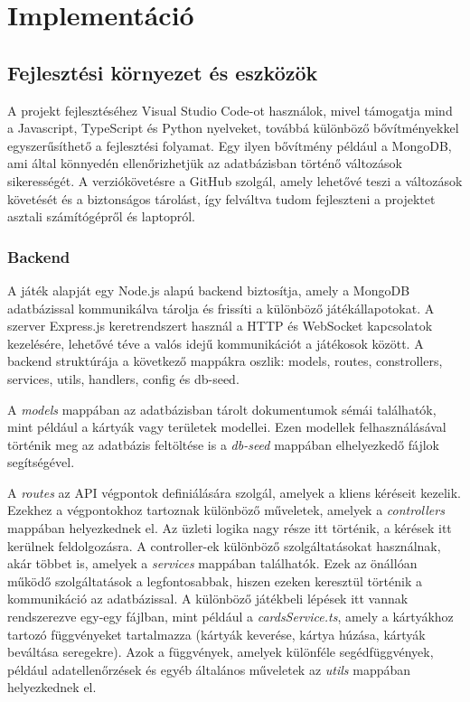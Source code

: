 \documentclass[
]{thesis-ekf}
\theoremstyle{definition}
\theoremstyle{remark}
\begin{document}
\chapter{Implementáció}

\section{Fejlesztési környezet és eszközök}

A projekt fejlesztéséhez Visual Studio Code-ot használok, mivel támogatja mind a Javascript, TypeScript és Python nyelveket, továbbá különböző bővítményekkel egyszerűsíthető a fejlesztési folyamat. Egy ilyen bővítmény például a MongoDB, ami által könnyedén ellenőrizhetjük az adatbázisban történő változások sikerességét. A verziókövetésre a GitHub szolgál, amely lehetővé teszi a változások követését és a biztonságos tárolást, így felváltva tudom fejleszteni a projektet asztali számítógépről és laptopról.

\subsection{Backend}

A játék alapját egy Node.js alapú backend biztosítja, amely a MongoDB adatbázissal kommunikálva tárolja és frissíti a különböző játékállapotokat. A szerver Express.js keretrendszert használ a HTTP és WebSocket kapcsolatok kezelésére, lehetővé téve a valós idejű kommunikációt a játékosok között. A backend struktúrája a következő mappákra oszlik: models, routes, constrollers, services, utils, handlers, config és db-seed. 

A \emph{models} mappában az adatbázisban tárolt dokumentumok sémái találhatók, mint például a kártyák vagy területek modellei. Ezen modellek felhasználásával történik meg az adatbázis feltöltése is a \emph{db-seed} mappában elhelyezkedő fájlok segítségével. 

A \emph{routes} az API végpontok definiálására szolgál, amelyek a kliens kéréseit kezelik. Ezekhez a végpontokhoz tartoznak különböző műveletek, amelyek a \emph{controllers} mappában helyezkednek el. Az üzleti logika nagy része itt történik, a kérések itt kerülnek feldolgozásra. A controller-ek különböző szolgáltatásokat használnak, akár többet is, amelyek a \emph{services} mappában találhatók. Ezek az önállóan működő szolgáltatások a legfontosabbak, hiszen ezeken keresztül történik a kommunikáció az adatbázissal. A különböző játékbeli lépések itt vannak rendszerezve egy-egy fájlban, mint például a \emph{cardsService.ts}, amely a kártyákhoz tartozó függvényeket tartalmazza (kártyák keverése, kártya húzása, kártyák beváltása seregekre). Azok a függvények, amelyek különféle segédfüggvények, például adatellenőrzések és egyéb általános műveletek az \emph{utils} mappában helyezkednek el.
\end{document}
